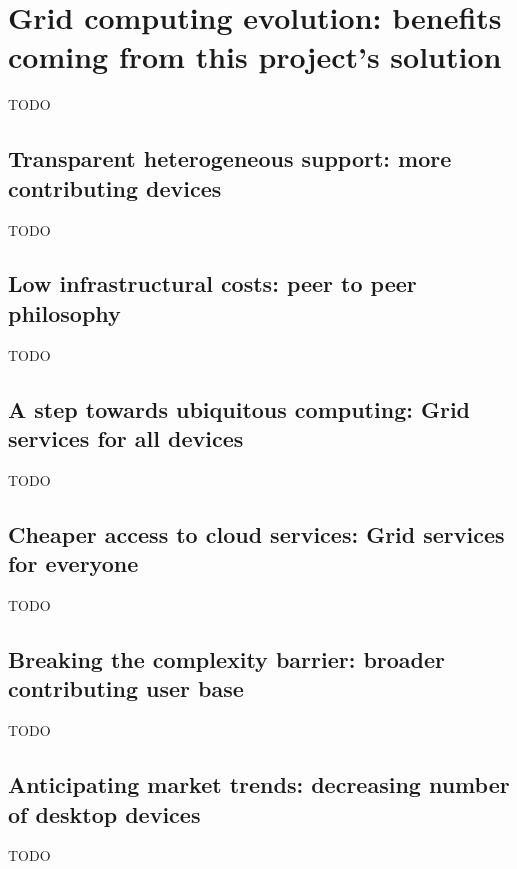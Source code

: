 \section{Grid computing evolution: benefits coming from this project's solution}
TODO

\subsection{Transparent heterogeneous support: more contributing devices}
TODO

\subsection{Low infrastructural costs: peer to peer philosophy}
TODO

\subsection{A step towards ubiquitous computing: Grid services for all devices}
TODO

\subsection{Cheaper access to cloud services: Grid services for everyone}
TODO

\subsection{Breaking the complexity barrier: broader contributing user base}
TODO

\subsection{Anticipating market trends: decreasing number of desktop devices}
TODO